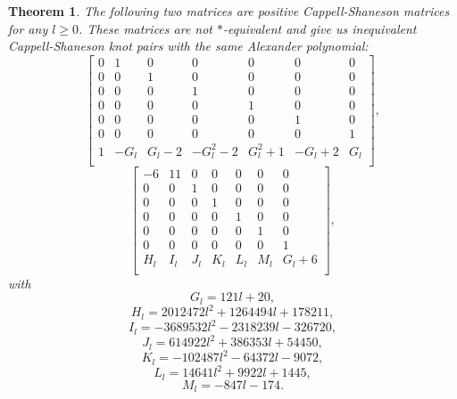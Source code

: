 \documentclass[10pt,a4paper]{amsart}
\newtheorem{theorem}{Theorem}
\begin{document}
\begin{theorem}
    The following two matrices are positive Cappell-Shaneson matrices for any $l \ge 0$. These matrices are not $*$-equivalent and give us inequivalent Cappell-Shaneson knot pairs with the same Alexander polynomial:
    \[
        \begin{bmatrix}
    		0 & 1 & 0 & 0 & 0 & 0 & 0\\
    		0 & 0 & 1 & 0 & 0 & 0 & 0\\
    		0 & 0 & 0 & 1 & 0 & 0 & 0\\
                0 & 0 & 0 & 0 & 1 & 0 & 0\\
                0 & 0 & 0 & 0 & 0 & 1 & 0\\
                0 & 0 & 0 & 0 & 0 & 0 & 1\\
                1 & -G_l & G_l-2 & -G_l^2-2 & G_l^2+1 & -G_l+2 & G_l\\
    		\end{bmatrix},
    \]
    \[
        \begin{bmatrix}
    	-6 & 11 & 0 & 0 & 0 & 0 & 0\\
            0 & 0 & 1 & 0 & 0 & 0 & 0\\
            0 & 0 & 0 & 1 & 0 & 0 & 0\\
            0 & 0 & 0 & 0 & 1 & 0 & 0\\
            0 & 0 & 0 & 0 & 0 & 1 & 0\\
            0 & 0 & 0 & 0 & 0 & 0 & 1\\
            H_l & I_l & J_l & K_l & L_l & M_l & G_l+6\\
    		\end{bmatrix},
    \] with
    \[
    G_l = 121l+20,
    \]
    \[
    H_l = 2012472l^2+1264494l+178211,
    \]
    \[
    I_l = -3689532l^2-2318239l-326720,
    \]
    \[
    J_l = 614922l^2+386353l+54450,
    \]
    \[
    K_l = -102487l^2-64372l-9072,
    \]
    \[
    L_l = 14641l^2+9922l+1445,
    \]
    \[
    M_l = -847l-174.
    \]
\end{theorem}
\end{document}
